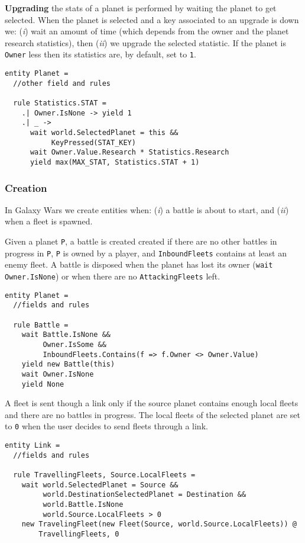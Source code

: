 \textbf{Upgrading} the stats of a planet is performed by waiting the planet to get selected. When the planet is selected and a key associated to an upgrade is down we: (\textit{i}) wait an amount of time (which depends from the owner and the planet research statistics), then (\textit{ii}) we upgrade the selected statistic. If the planet is \texttt{Owner} less then its statistics are, by default, set to \texttt{1}.

\begin{lstlisting}
entity Planet = 
  //other field and rules

  rule Statistics.STAT =
    .| Owner.IsNone -> yield 1
    .| _ ->
      wait world.SelectedPlanet = this &&
           KeyPressed(STAT_KEY)
      wait Owner.Value.Research * Statistics.Research
      yield max(MAX_STAT, Statistics.STAT + 1)
\end{lstlisting}


\subsubsection{Creation}
In Galaxy Wars we create entities when: (\textit{i}) a battle is about to start, and (\textit{ii}) when a fleet is spawned.

\noindent
Given a planet \texttt{P}, a battle is created created if there are no other battles in progress in \texttt{P}, \texttt{P} is owned by a player, and \texttt{InboundFleets} contains at least an enemy fleet. A battle is disposed when the planet has lost its owner (\texttt{wait Owner.IsNone}) or when there are no \texttt{AttackingFleets} left.
\begin{lstlisting}
entity Planet =
  //fields and rules  

  rule Battle =
    wait Battle.IsNone && 
         Owner.IsSome &&
         InboundFleets.Contains(f => f.Owner <> Owner.Value)
    yield new Battle(this)
    wait Owner.IsNone
    yield None
\end{lstlisting}


\noindent
A fleet is sent though a link only if the source planet contains enough local fleets and there are no battles in progress. The local fleets of the selected planet are set to \texttt{0} when the user decides to send fleets through a link.

\begin{lstlisting}
entity Link =
  //fields and rules

  rule TravellingFleets, Source.LocalFleets = 
    wait world.SelectedPlanet = Source &&
         world.DestinationSelectedPlanet = Destination &&
         world.Battle.IsNone
         world.Source.LocalFleets > 0
    new TravelingFleet(new Fleet(Source, world.Source.LocalFleets)) @
        TravellingFleets, 0
\end{lstlisting}

